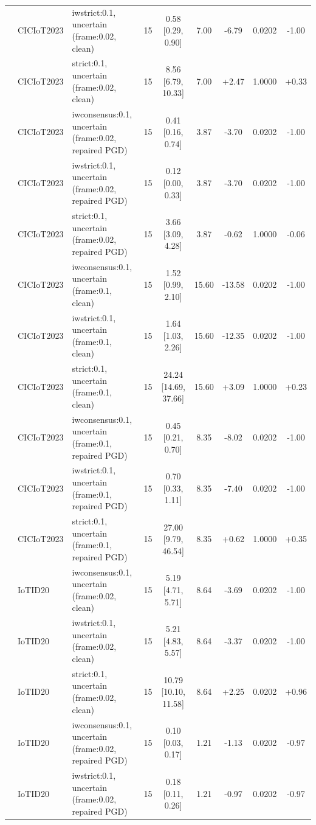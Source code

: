\begin{table}[t]
\begin{tabular}{lllcccccc}
 & CICIoT2023 & iwstrict:0.1, uncertain (frame:0.02, clean) & 15 & 0.58 [0.29, 0.90] & 7.00 & -6.79 & 0.0202 & -1.00 \\
 & CICIoT2023 & strict:0.1, uncertain (frame:0.02, clean) & 15 & 8.56 [6.79, 10.33] & 7.00 & +2.47 & 1.0000 & +0.33 \\
 & CICIoT2023 & iwconsensus:0.1, uncertain (frame:0.02, repaired PGD) & 15 & 0.41 [0.16, 0.74] & 3.87 & -3.70 & 0.0202 & -1.00 \\
 & CICIoT2023 & iwstrict:0.1, uncertain (frame:0.02, repaired PGD) & 15 & 0.12 [0.00, 0.33] & 3.87 & -3.70 & 0.0202 & -1.00 \\
 & CICIoT2023 & strict:0.1, uncertain (frame:0.02, repaired PGD) & 15 & 3.66 [3.09, 4.28] & 3.87 & -0.62 & 1.0000 & -0.06 \\
 & CICIoT2023 & iwconsensus:0.1, uncertain (frame:0.1, clean) & 15 & 1.52 [0.99, 2.10] & 15.60 & -13.58 & 0.0202 & -1.00 \\
 & CICIoT2023 & iwstrict:0.1, uncertain (frame:0.1, clean) & 15 & 1.64 [1.03, 2.26] & 15.60 & -12.35 & 0.0202 & -1.00 \\
 & CICIoT2023 & strict:0.1, uncertain (frame:0.1, clean) & 15 & 24.24 [14.69, 37.66] & 15.60 & +3.09 & 1.0000 & +0.23 \\
 & CICIoT2023 & iwconsensus:0.1, uncertain (frame:0.1, repaired PGD) & 15 & 0.45 [0.21, 0.70] & 8.35 & -8.02 & 0.0202 & -1.00 \\
 & CICIoT2023 & iwstrict:0.1, uncertain (frame:0.1, repaired PGD) & 15 & 0.70 [0.33, 1.11] & 8.35 & -7.40 & 0.0202 & -1.00 \\
 & CICIoT2023 & strict:0.1, uncertain (frame:0.1, repaired PGD) & 15 & 27.00 [9.79, 46.54] & 8.35 & +0.62 & 1.0000 & +0.35 \\
 & IoTID20 & iwconsensus:0.1, uncertain (frame:0.02, clean) & 15 & 5.19 [4.71, 5.71] & 8.64 & -3.69 & 0.0202 & -1.00 \\
 & IoTID20 & iwstrict:0.1, uncertain (frame:0.02, clean) & 15 & 5.21 [4.83, 5.57] & 8.64 & -3.37 & 0.0202 & -1.00 \\
 & IoTID20 & strict:0.1, uncertain (frame:0.02, clean) & 15 & 10.79 [10.10, 11.58] & 8.64 & +2.25 & 0.0202 & +0.96 \\
 & IoTID20 & iwconsensus:0.1, uncertain (frame:0.02, repaired PGD) & 15 & 0.10 [0.03, 0.17] & 1.21 & -1.13 & 0.0202 & -0.97 \\
 & IoTID20 & iwstrict:0.1, uncertain (frame:0.02, repaired PGD) & 15 & 0.18 [0.11, 0.26] & 1.21 & -0.97 & 0.0202 & -0.97 \\

\end{tabular}
\end{table}

